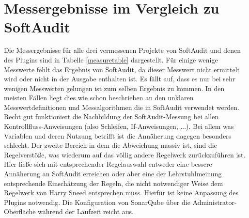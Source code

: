 \documentclass[gb,ngerman]{stthesis}
\begin{document}
		\section{Messergebnisse im Vergleich zu SoftAudit}
			Die Messergebnisse für alle drei vermessenen Projekte von SoftAudit und denen des Plugins sind in Tabelle \ref{measuretable} dargestellt. Für einige wenige Messwerte fehlt das Ergebnis von SoftAudit, da dieser Messwert nicht ermittelt wird oder nicht in der Ausgabe enthalten ist. \newline
			Es fällt auf, dass es nur bei sehr wenigen Messwerten gelungen ist zum selben Ergebnis zu kommen. In den meisten Fällen liegt dies wie schon beschrieben an den unklaren Messwertdefinitionen und Messalgorithmen die in SoftAudit verwendet werden. Recht gut funktioniert die Nachbildung der SoftAudit-Messung bei allen Kontrollfluss-Anweisungen (also Schleifen, If-Anweisungen, ...). Bei allem was Variablen und deren Nutzung betrifft ist die Annäherung dagegen besonders schlecht. Der zweite Bereich in dem die Abweichung massiv ist, sind die Regelverstöße, was wiederum auf das völlig andere Regelwerk zurückzuführen ist. Hier ließe sich mit entsprechender Regelauswahl entweder eine bessere Annäherung an SoftAudit erreichen oder aber eine der Lehrstuhlmeinung entsprechende Einschätzung der Regeln, die nicht notwendiger Weise dem Regelwerk von Harry Sneed entsprechen muss. Hierfür ist keine Anpassung des Plugins notwendig. Die Konfiguration von SonarQube über die Administrator-Oberfläche während der Laufzeit reicht aus. \newline
\end{document}
